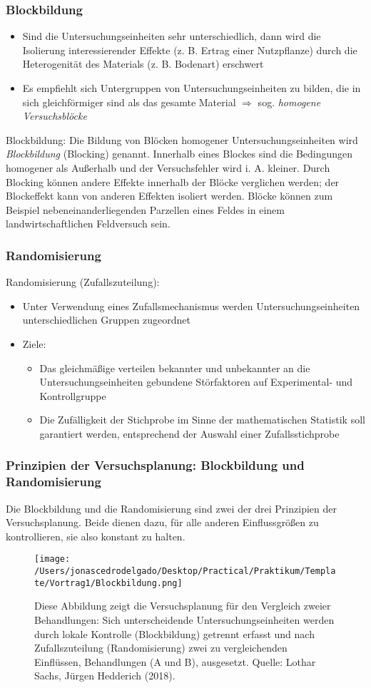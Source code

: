 \documentclass{beamer}
\begin{document}
\begin{frame}
\frametitle{Blockbildung}
\begin{itemize}
\item Sind die Untersuchungseinheiten sehr unterschiedlich, dann wird die Isolierung interessierender Effekte (z. B. Ertrag einer Nutzpflanze) durch die Heterogenität des Materials (z. B. Bodenart) erschwert
\item Es empfiehlt sich Untergruppen von Untersuchungseinheiten zu bilden, die in sich gleichförmiger sind als das gesamte Material $\Rightarrow$ sog. \textit{homogene Versuchsblöcke}
\end{itemize}
\begin{exampleblock}{Blockbildung:}
Die Bildung von Blöcken homogener Untersuchungseinheiten wird \textit{Blockbildung} (Blocking) genannt. Innerhalb eines Blockes sind die Bedingungen homogener als Außerhalb und der Versuchsfehler wird i. A. kleiner. Durch Blocking können andere Effekte innerhalb der Blöcke verglichen werden; der Blockeffekt kann von anderen Effekten isoliert werden. Blöcke können zum Beispiel nebeneinanderliegenden Parzellen eines Feldes in einem landwirtschaftlichen Feldversuch sein.
\end{exampleblock}
\end{frame}

\begin{frame}
\frametitle{Randomisierung}
Randomisierung (Zufallszuteilung):
\begin{itemize}
\item Unter Verwendung eines Zufallsmechanismus werden Untersuchungseinheiten unterschiedlichen Gruppen zugeordnet
\item Ziele:
\begin{itemize}
\item Das gleichmäßige verteilen bekannter und unbekannter an die Untersuchungseinheiten gebundene Störfaktoren auf Experimental- und Kontrollgruppe
\item Die Zufälligkeit der Stichprobe im Sinne der mathematischen Statistik soll garantiert werden, entsprechend der Auswahl einer Zufallsstichprobe
\end{itemize}
\end{itemize}
\end{frame}

\begin{frame}
\frametitle{Prinzipien der Versuchsplanung: Blockbildung und Randomisierung}
Die Blockbildung und die Randomisierung sind zwei der drei Prinzipien der Versuchsplanung. Beide dienen dazu, für alle anderen Einflussgrößen zu kontrollieren, sie also konstant zu halten.
\begin{figure}
\texttt{[image: /Users/jonascedrodelgado/Desktop/Practical/Praktikum/Template/Vortrag1/Blockbildung.png]}
\caption{Diese Abbildung zeigt die Versuchsplanung für den Vergleich zweier Behandlungen: Sich unterscheidende Untersuchungseinheiten werden durch lokale Kontrolle (Blockbildung) getrennt erfasst und nach Zufallszuteilung (Randomisierung) zwei zu vergleichenden Einflüssen, Behandlungen (A und B), ausgesetzt. Quelle: Lothar Sachs, Jürgen Hedderich (2018).}
\end{figure}
\end{frame}
\end{document}
